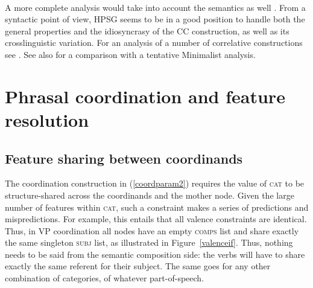 \documentclass[output=paper
                ,modfonts
                ,nonflat
	        ,collection
	        ,collectionchapter
	        ,collectiontoclongg
 	        ,biblatex
                ,babelshorthands
                ,newtxmath
                ,draftmode
                ,colorlinks, citecolor=brown
]{./langsci/langscibook}
\begin{document}
{\ea
\label{ccf}
 \impl\\ %
\z

A more complete analysis would take into account the semantics as well \citep[Section~5.5]{fgsag08}. From a syntactic point of view, HPSG seems to be in a good position to handle both the general properties and the idiosyncrasy of the CC construction, as well as its crosslinguistic variation. 
For an analysis of a number of  correlative constructions see \citet{Alqurashi:Borsley:14}.
See also  \citet{Borsley:11} for a comparison with a tentative Minimalist analysis.


\section{Phrasal coordination and feature resolution}

\subsection{Feature sharing between coordinands}

The coordination construction in (\ref{coordparam2}) requires the value of \textsc{cat} to be structure-shared across the coordinands and the mother node. Given the large number of features within \textsc{cat}, such a constraint makes a series of predictions and mispredictions.
For example, this entails that all valence constraints are identical. Thus, in VP coordination all nodes have an empty \textsc{comps} list and share exactly the same singleton \textsc{subj} list, as illustrated in Figure~\ref{valenceif}. Thus, nothing needs to be said from the semantic composition side: the verbs will have to share exactly the same referent for their subject. The same goes for any other combination of categories, of whatever part-of-speech.

}
\end{document}
